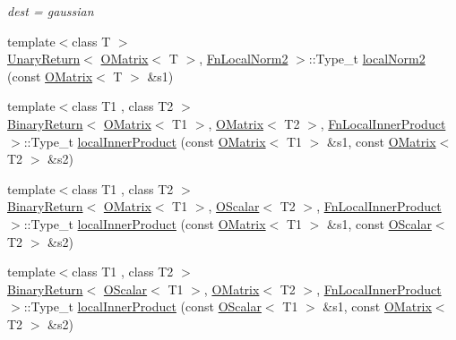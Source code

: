 \begin{DoxyCompactItemize}
\begin{DoxyCompactList}\small\item\em dest = gaussian \end{DoxyCompactList}\item 
{\footnotesize template$<$class T $>$ }\\\mbox{\hyperlink{structENSEM_1_1UnaryReturn}{Unary\+Return}}$<$ \mbox{\hyperlink{classENSEM_1_1OMatrix}{O\+Matrix}}$<$ T $>$, \mbox{\hyperlink{structENSEM_1_1FnLocalNorm2}{Fn\+Local\+Norm2}} $>$\+::Type\+\_\+t \mbox{\hyperlink{group__obsmatrix_ga13d075f8a50ffa95c7a8a7fa61fe8028}{local\+Norm2}} (const \mbox{\hyperlink{classENSEM_1_1OMatrix}{O\+Matrix}}$<$ T $>$ \&s1)
\item 
{\footnotesize template$<$class T1 , class T2 $>$ }\\\mbox{\hyperlink{structENSEM_1_1BinaryReturn}{Binary\+Return}}$<$ \mbox{\hyperlink{classENSEM_1_1OMatrix}{O\+Matrix}}$<$ T1 $>$, \mbox{\hyperlink{classENSEM_1_1OMatrix}{O\+Matrix}}$<$ T2 $>$, \mbox{\hyperlink{structENSEM_1_1FnLocalInnerProduct}{Fn\+Local\+Inner\+Product}} $>$\+::Type\+\_\+t \mbox{\hyperlink{group__obsmatrix_ga53af10b5c51df2876f7569d4691cbd0d}{local\+Inner\+Product}} (const \mbox{\hyperlink{classENSEM_1_1OMatrix}{O\+Matrix}}$<$ T1 $>$ \&s1, const \mbox{\hyperlink{classENSEM_1_1OMatrix}{O\+Matrix}}$<$ T2 $>$ \&s2)
\item 
{\footnotesize template$<$class T1 , class T2 $>$ }\\\mbox{\hyperlink{structENSEM_1_1BinaryReturn}{Binary\+Return}}$<$ \mbox{\hyperlink{classENSEM_1_1OMatrix}{O\+Matrix}}$<$ T1 $>$, \mbox{\hyperlink{classENSEM_1_1OScalar}{O\+Scalar}}$<$ T2 $>$, \mbox{\hyperlink{structENSEM_1_1FnLocalInnerProduct}{Fn\+Local\+Inner\+Product}} $>$\+::Type\+\_\+t \mbox{\hyperlink{group__obsmatrix_ga23c94fe0afdadaedf50d233d675f0009}{local\+Inner\+Product}} (const \mbox{\hyperlink{classENSEM_1_1OMatrix}{O\+Matrix}}$<$ T1 $>$ \&s1, const \mbox{\hyperlink{classENSEM_1_1OScalar}{O\+Scalar}}$<$ T2 $>$ \&s2)
\item 
{\footnotesize template$<$class T1 , class T2 $>$ }\\\mbox{\hyperlink{structENSEM_1_1BinaryReturn}{Binary\+Return}}$<$ \mbox{\hyperlink{classENSEM_1_1OScalar}{O\+Scalar}}$<$ T1 $>$, \mbox{\hyperlink{classENSEM_1_1OMatrix}{O\+Matrix}}$<$ T2 $>$, \mbox{\hyperlink{structENSEM_1_1FnLocalInnerProduct}{Fn\+Local\+Inner\+Product}} $>$\+::Type\+\_\+t \mbox{\hyperlink{group__obsmatrix_gac43a43c02ea508251047ef46cbc6924c}{local\+Inner\+Product}} (const \mbox{\hyperlink{classENSEM_1_1OScalar}{O\+Scalar}}$<$ T1 $>$ \&s1, const \mbox{\hyperlink{classENSEM_1_1OMatrix}{O\+Matrix}}$<$ T2 $>$ \&s2)

\end{DoxyCompactItemize}
